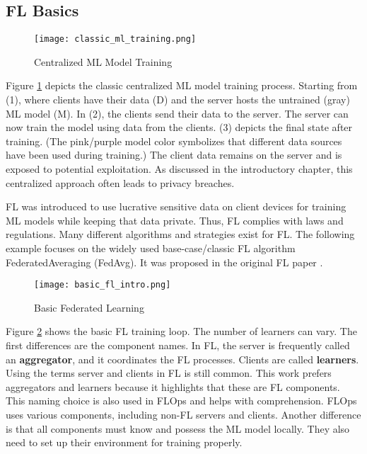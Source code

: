 
\subsection{FL Basics}

\begin{figure}[h]
    \centering
    \texttt{[image: classic\_ml\_training.png]}
    \caption{Centralized ML Model Training}
    \label{fig:classic_ml_training}
\end{figure}
Figure \ref{fig:classic_ml_training} depicts the classic centralized ML model training process.
Starting from (1), where clients have their data (D) and the server hosts the untrained (gray) ML model (M).
In (2), the clients send their data to the server.
The server can now train the model using data from the clients.
(3) depicts the final state after training.
(The pink/purple model color symbolizes that different data sources have been used during training.)
The client data remains on the server and is exposed to potential exploitation.
As discussed in the introductory chapter, this centralized approach often leads to privacy breaches.

FL was introduced to use lucrative sensitive data on client devices for training ML models while keeping that data private.
Thus, FL complies with laws and regulations.
Many different algorithms and strategies exist for FL.
The following example focuses on the widely used base-case/classic FL algorithm FederatedAveraging (FedAvg).
It was proposed in the original FL paper \cite{paper:original_fl}.

\begin{figure}%
    \centering
    \texttt{[image: basic\_fl\_intro.png]}
    \caption{Basic Federated Learning}
    \label{fig:basic_fl_intro}
\end{figure}
Figure \ref{fig:basic_fl_intro} shows the basic FL training loop.
The number of learners can vary.
The first differences are the component names.
In FL, the server is frequently called an \textbf{aggregator}, and it coordinates the FL processes.
Clients are called \textbf{learners}.
Using the terms server and clients in FL is still common.
This work prefers aggregators and learners because it highlights that these are FL components.
This naming choice is also used in FLOps and helps with comprehension.
FLOps uses various components, including non-FL servers and clients.
Another difference is that all components must know and possess the ML model locally.
They also need to set up their environment for training properly.

